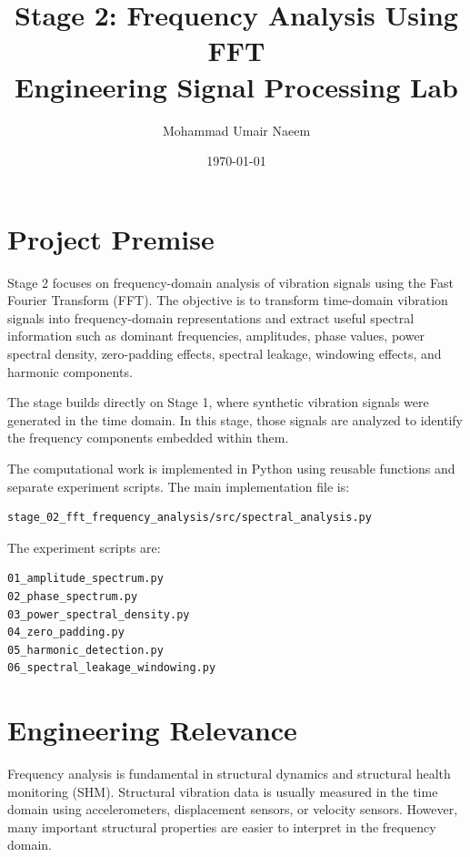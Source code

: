 \documentclass[11pt,a4paper]{article}
\title{
    \textbf{Stage 2: Frequency Analysis Using FFT} \\
    \large Engineering Signal Processing Lab
}
\author{
    Mohammad Umair Naeem
}
\date{\today}
\begin{document}
\maketitle

\section{Project Premise}

Stage 2 focuses on frequency-domain analysis of vibration signals using the Fast Fourier Transform (FFT). The objective is to transform time-domain vibration signals into frequency-domain representations and extract useful spectral information such as dominant frequencies, amplitudes, phase values, power spectral density, zero-padding effects, spectral leakage, windowing effects, and harmonic components.

The stage builds directly on Stage 1, where synthetic vibration signals were generated in the time domain. In this stage, those signals are analyzed to identify the frequency components embedded within them.

The computational work is implemented in Python using reusable functions and separate experiment scripts. The main implementation file is:

\begin{verbatim}
stage_02_fft_frequency_analysis/src/spectral_analysis.py
\end{verbatim}

The experiment scripts are:

\begin{verbatim}
01_amplitude_spectrum.py
02_phase_spectrum.py
03_power_spectral_density.py
04_zero_padding.py
05_harmonic_detection.py
06_spectral_leakage_windowing.py
\end{verbatim}

\section{Engineering Relevance}

Frequency analysis is fundamental in structural dynamics and structural health monitoring (SHM). Structural vibration data is usually measured in the time domain using accelerometers, displacement sensors, or velocity sensors. However, many important structural properties are easier to interpret in the frequency domain.
\end{document}
